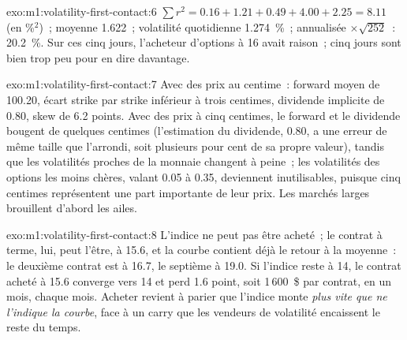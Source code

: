 \begin{solution}{exo:m1:volatility-first-contact:6}
$\sum r^2 = 0.16 + 1.21 + 0.49 + 4.00 + 2.25 = 8.11$ (en \%$^2$)~; moyenne 1.622~;
volatilité quotidienne 1.274~\%~; annualisée $\times\sqrt{252}$~: 20.2~\%. Sur ces
cinq jours, l'acheteur d'options à 16 avait raison~; cinq jours sont bien trop peu
pour en dire davantage.
\end{solution}

\begin{solution}{exo:m1:volatility-first-contact:7}
Avec des prix au centime~: forward moyen de 100.20, écart strike par strike inférieur à trois
centimes, dividende implicite de 0.80, skew de 6.2 points. Avec des prix à cinq centimes, le
forward et le dividende bougent de quelques centimes (l'estimation du dividende, 0.80, a une
erreur de même taille que l'arrondi, soit plusieurs pour cent de sa propre valeur), tandis que les
volatilités proches de la monnaie changent à peine~; les volatilités des options les moins
chères, valant 0.05 à 0.35, deviennent inutilisables, puisque cinq centimes représentent une
part importante de leur prix. Les marchés larges brouillent d'abord les ailes.
\end{solution}

\begin{solution}{exo:m1:volatility-first-contact:8}
L'indice ne peut pas être acheté~; le contrat à terme, lui, peut l'être, à 15.6, et la courbe
contient déjà le retour à la moyenne~: le deuxième contrat est à 16.7, le septième à
19.0. Si l'indice reste à 14, le contrat acheté à 15.6 converge vers 14 et
perd 1.6 point, soit 1\,600~\$ par contrat, en un mois, chaque mois. Acheter revient à
parier que l'indice monte \emph{plus vite que ne l'indique la courbe}, face à un carry que
les vendeurs de volatilité encaissent le reste du temps.
\end{solution}

